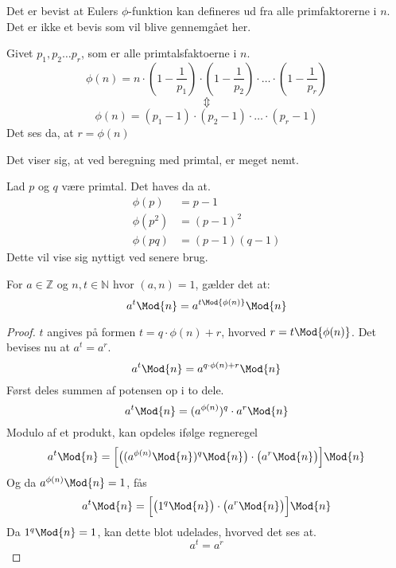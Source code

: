 Det er bevist at Eulers \(\phi\)-funktion kan defineres ud fra alle primfaktorerne i \(n\).
Det er ikke et bevis som vil blive gennemgået her.

\begin{sent}
    Givet \(p_1, p_2 \hdots p_r\), som er alle primtalsfaktoerne i \(n\).
    \[\phi(n) = n \cdot \left(1-\frac{1}{p_1}\right) \cdot \left(1-\frac{1}{p_2}\right) \cdot \hdots \cdot \left(1-\frac{1}{p_r}\right)\]
    \[\Updownarrow\]
    \[\phi(n) = (p_1 - 1) \cdot (p_2 - 1) \cdot \hdots \cdot (p_r - 1)\]
    Det ses da, at \(r = \phi(n)\)
\end{sent}

Det viser sig, at ved beregning med primtal, er meget nemt.

\begin{eks}
    Lad \(p\) og \(q\) være primtal. Det haves da at.\\
    \begin{align}
        \phi(p)   &= p - 1\\
        \phi(p^2) &= (p - 1)^2\\
        \phi(p q) &= (p - 1)(q - 1)
    \end{align}
    Dette vil vise sig nyttigt ved senere brug.
\end{eks}




\vspace{100pt}



\begin{sent}
    For \(a \in \mathbb{Z}\) og \(n, t \in \mathbb{N}\) hvor \((a, n) = 1\), gælder det at:
    \[a^t \Mod{n} = a^{t \Mod{\phi(n)}} \Mod{n}\]
\end{sent}


\begin{proof}
    \(t\) angives på formen \(t = q \cdot \phi(n) + r\), hvorved \(r = t \Mod{\phi(n)}\).
    Det bevises nu at \(a^t = a^r\).
    \[a^t \Mod{n} = a^{q \cdot \phi(n) + r} \Mod{n}\]
    Først deles summen af potensen op i to dele.
    \[a^t \Mod{n} = (a^{\phi(n)})^q \cdot a^r \Mod{n}\]
    Modulo af et produkt, kan opdeles ifølge regneregel %
    \[a^t \Mod{n} = \Big[ \big( (a^{\phi(n)} \Mod{n})^q \Mod{n} \big) \cdot \big( a^r \Mod{n} \big) \Big] \Mod{n}\] %
    Og da \(a^{\phi(n)} \Mod{n} = 1\), fås
    \[a^t \Mod{n} = \Big[ \big( 1^q \Mod{n} \big) \cdot \big( a^r \Mod{n} \big) \Big] \Mod{n}\]
    Da \(1^q \Mod{n} = 1\), kan dette blot udelades, hvorved det ses at.
    \[a^t = a^r\]
\end{proof}

